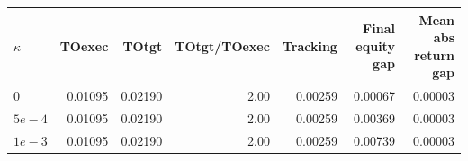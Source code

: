 \begin{tabular}{lrrrrrr}
\hline
$\kappa$ & TOexec & TOtgt & TOtgt/TOexec & Tracking & Final equity gap & Mean abs return gap \\
\hline
$0$ & 0.01095 & 0.02190 & 2.00 & 0.00259 & 0.00067 & 0.00003 \\
$5e-4$ & 0.01095 & 0.02190 & 2.00 & 0.00259 & 0.00369 & 0.00003 \\
$1e-3$ & 0.01095 & 0.02190 & 2.00 & 0.00259 & 0.00739 & 0.00003 \\
\hline
\end{tabular}

